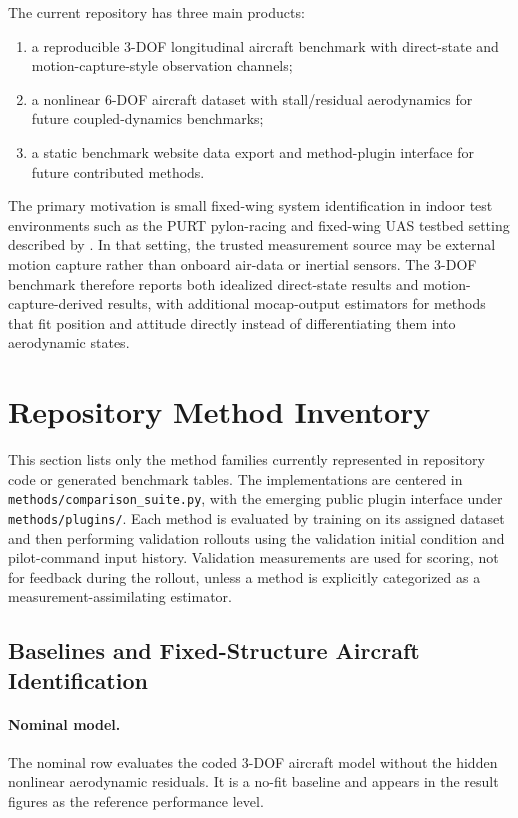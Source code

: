 \documentclass[11pt]{article}
\begin{document}
The current repository has three main products:
\begin{enumerate}
    \item a reproducible 3-DOF longitudinal aircraft benchmark with direct-state and motion-capture-style observation channels;
    \item a nonlinear 6-DOF aircraft dataset with stall/residual aerodynamics for future coupled-dynamics benchmarks;
    \item a static benchmark website data export and method-plugin interface for future contributed methods.
\end{enumerate}

The primary motivation is small fixed-wing system identification in indoor test environments such as the PURT pylon-racing and fixed-wing UAS testbed setting described by \citet{sribunma2026indoor}. In that setting, the trusted measurement source may be external motion capture rather than onboard air-data or inertial sensors. The 3-DOF benchmark therefore reports both idealized direct-state results and motion-capture-derived results, with additional mocap-output estimators for methods that fit position and attitude directly instead of differentiating them into aerodynamic states.

\section{Repository Method Inventory}

This section lists only the method families currently represented in repository code or generated benchmark tables. The implementations are centered in \texttt{methods/comparison\_suite.py}, with the emerging public plugin interface under \texttt{methods/plugins/}. Each method is evaluated by training on its assigned dataset and then performing validation rollouts using the validation initial condition and pilot-command input history. Validation measurements are used for scoring, not for feedback during the rollout, unless a method is explicitly categorized as a measurement-assimilating estimator.

\subsection{Baselines and Fixed-Structure Aircraft Identification}

\paragraph{Nominal model.}
The nominal row evaluates the coded 3-DOF aircraft model without the hidden nonlinear aerodynamic residuals. It is a no-fit baseline and appears in the result figures as the reference performance level.
\end{document}
